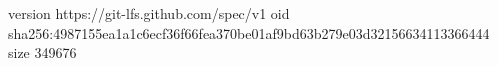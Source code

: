 version https://git-lfs.github.com/spec/v1
oid sha256:4987155ea1a1c6ecf36f66fea370be01af9bd63b279e03d32156634113366444
size 349676
